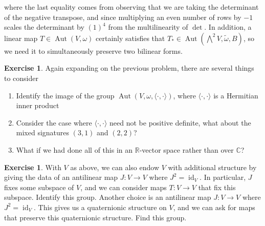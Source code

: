 \documentclass[psamsfonts]{amsart}
\theoremstyle{definition}
\newtheorem{exer}[thm]{Exercise}
\theoremstyle{remark}
\newcommand{\R}{\mathbb{R}}
\newcommand{\C}{\mathbb{C}}
\DeclareMathOperator{\id}{id}
\DeclareMathOperator{\Aut}{Aut}
\begin{document}
where the last equality comes from observing that we are taking the determinant of the negative transpose, and since multiplying an even number of rows by $-1$ scales the determinant by $(1)^4$ from the multilinearity of $\det$. In addition, a linear map $T \in \Aut(V,\omega)$ certainly satisfies that $T_* \in \Aut(\bigwedge^2V, \tilde{\omega}, B)$, so we need it to simultaneously preserve two bilinear forms.
%
\begin{exer}
Again expanding on the previous problem, there are several things to consider
\begin{enumerate}
\item Identify the image of the group $\Aut(V,\omega, \langle \cdot,\cdot \rangle)$, where $\langle \cdot, \cdot \rangle$ is a Hermitian inner product
\item Consider the case where $\langle \cdot,\cdot \rangle$ need not be positive definite, what about the mixed signatures $(3,1)$ and $(2,2)$?
\item What if we had done all of this in an $\R$-vector space rather than over $\C$?
\end{enumerate}
\end{exer}
%
\begin{exer}
With $V$ as above, we can also endow $V$ with additional structure by giving the data of an antilinear map $J : V \to V$ where $J^2 = \id_V$. In particular, $J$ fixes some subspace of $V$, and we can consider maps $T : V \to V$ that fix this subspace. Identify this group. Another choice is an antilinear map $J : V \to V$ where $J^2 = \id_V$. This gives us a quaternionic structure on $V$, and we can ask for maps that preserve this quaternionic structure. Find this group.
\end{exer}
%
\end{document}
